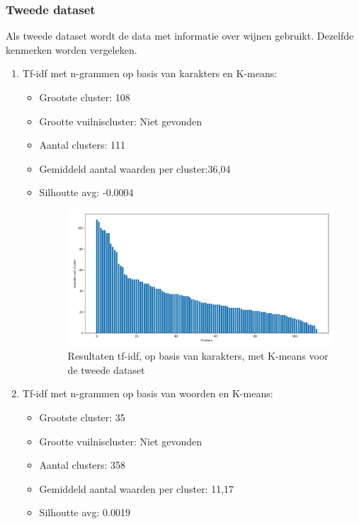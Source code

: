 \newpage

\subsubsection{Tweede dataset}
Als tweede dataset wordt de data met informatie over wijnen gebruikt. Dezelfde kenmerken worden vergeleken.
\\\indent

\begin{enumerate}
    \item Tf-idf met n-grammen op basis van karakters en K-means:
    \begin{itemize}
        \item Grootste cluster: 108
        \item Grootte vuilniscluster: Niet gevonden
        \item Aantal clusters: 111
        \item Gemiddeld aantal waarden per cluster:36,04
        \item Silhoutte avg: -0.0004
        \\\indent
        \begin{figure}[h]
            \centering
            \includegraphics[width=0.7\linewidth]{../foto's/winedatatfidfkmeans}
            \caption{Resultaten tf-idf, op basis van karakters, met K-means voor de tweede dataset}
            \label{fig:dataset2_tf-idf_kmeans_char}
        \end{figure}
    \end{itemize}
    \newpage
    \item Tf-idf met n-grammen op basis van woorden en K-means:
    \begin{itemize}
        \item Grootste cluster: 35
        \item Grootte vuilniscluster: Niet gevonden
        \item Aantal clusters: 358
        \item Gemiddeld aantal waarden per cluster: 11,17
        \item Silhoutte avg: 0.0019

\end{itemize}
\end{enumerate}
